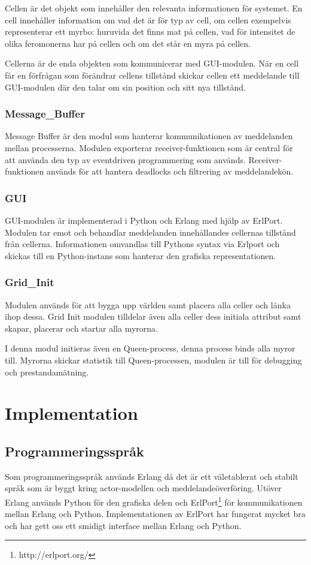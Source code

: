 \documentclass[12pt]{article}
\begin{document}
Cellen är det objekt som innehåller den relevanta informationen för systemet.
En cell innehåller information om vad det är för typ av cell,
om cellen exempelvis representerar ett myrbo: huruvida det finns mat på cellen,
vad för intensitet de olika feromonerna har på cellen och om det står en myra på cellen.

Cellerna är de enda objekten som kommunicerar med GUI-modulen.
När en cell får en förfrågan som förändrar cellens tillstånd skickar cellen ett meddelande till GUI-modulen där den talar om sin position och sitt nya tillstånd.

\subsubsection{Message\_Buffer}
Message Buffer är den modul som hanterar kommunikationen av meddelanden mellan processerna.
Modulen exporterar receiver-funktionen som är central för att använda den typ av eventdriven programmering som används.
Receiver-funktionen används för att hantera deadlocks och filtrering av meddelandekön.

\subsubsection{GUI}
GUI-modulen är implementerad i Python och Erlang med hjälp av ErlPort.
Modulen tar emot och behandlar meddelanden innehållandes cellernas tillstånd från cellerna.
Informationen omvandlas till Pythons syntax via Erlport och skickas till en Python-instans som hanterar den grafiska representationen.

\subsubsection{Grid\_Init}
Modulen används för att bygga upp världen samt placera alla celler och länka ihop dessa.
Grid Init modulen tilldelar även alla celler dess initiala attribut samt skapar,
placerar och startar alla myrorna.

I denna modul initieras även en Queen-process,
denna process binds alla myror till.
Myrorna skickar statistik till Queen-processen,
modulen är till för debugging och prestandamätning.

\section{Implementation}\label{sec:implementation}
\subsection{Programmeringsspråk}
Som programmeringsspråk används Erlang då det är ett väletablerat och stabilt språk som är byggt kring actor-modellen och meddelandeöverföring.
Utöver Erlang används Python för den grafiska delen och ErlPort\footnote{http://erlport.org/} för kommunikationen mellan Erlang och Python.
Implementationen av ErlPort har fungerat mycket bra och har gett oss ett smidigt interface mellan Erlang och Python.
\end{document}
